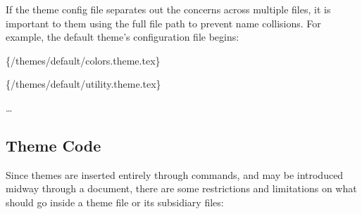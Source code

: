 		If the theme config file separates out the concerns across multiple files, it is important to  them using the full file path to prevent name collisions. For example, the default theme's configuration file begins:
		\begin{Code}
			\{/themes/default/colors.theme.tex\}

			\{/themes/default/utility.theme.tex\}

			\ldots
		\end{Code}

		\subsection{Theme Code}\label{S:ThemeCode}

			Since themes are inserted entirely through  commands, and may be introduced midway through a document, there are some restrictions and limitations on what should go inside a theme file or its subsidiary files:

